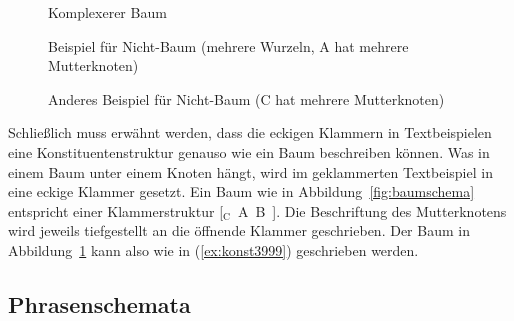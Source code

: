 \begin{figure}[!htbp]
  \centering
  \caption{Komplexerer Baum}
  \label{fig:ctree}
\end{figure}

\begin{figure}[!htbp]
  \centering
  \caption[Beispiel für Nicht-Baum]{Beispiel für Nicht-Baum (mehrere Wurzeln, A hat mehrere Mutterknoten)}
  \label{fig:notree1}
\end{figure}

\begin{figure}[!htbp]
  \centering
  \caption[Anderes Beispiel für Nicht-Baum]{Anderes Beispiel für Nicht-Baum (C hat mehrere Mutterknoten)}
  \label{fig:notree2}
\end{figure}

Schließlich muss erwähnt werden, dass die eckigen Klammern in Textbeispielen eine Konstituentenstruktur genauso wie ein Baum beschreiben können.
Was in einem Baum unter einem Knoten hängt, wird im geklammerten Textbeispiel in eine eckige Klammer gesetzt.
Ein Baum wie in Abbildung~\ref{fig:baumschema} entspricht einer Klammerstruktur [$_\mathrm{C}$~A~B~].
Die Beschriftung des Mutterknotens wird jeweils tiefgestellt an die öffnende Klammer geschrieben.
Der Baum in Abbildung~\ref{fig:ctree} kann also wie in (\ref{ex:konst3999}) geschrieben werden.

\begin{exe}
  \ex{\label{ex:konst3999} [$_\textrm{C}$~A~[$_\textrm{B}$~D~E~F~]~]}
\end{exe}

\subsection{Phrasenschemata}

\label{sec:topologische}

